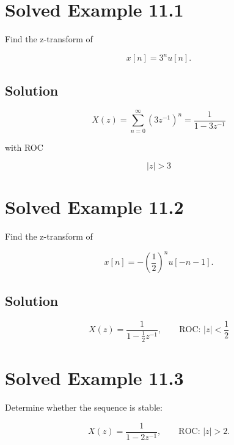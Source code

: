 
\section{Solved Example 11.1}

Find the z-transform of

\[
x[n]=3^n u[n].
\]


\subsection{Solution}

\[
X(z)=
\sum_{n=0}^{\infty}(3z^{-1})^n
=
\frac{1}{1-3z^{-1}}
\]

with ROC

\[
\boxed{
|z|>3
}
\]


\section{Solved Example 11.2}

Find the z-transform of

\[
x[n]=-\left(\frac12\right)^n u[-n-1].
\]


\subsection{Solution}

\[
\boxed{
X(z)=
\frac{1}{1-\frac12 z^{-1}},
\qquad
\text{ROC: }|z|<\frac12
}
\]


\section{Solved Example 11.3}

Determine whether the sequence is stable:

\[
X(z)=
\frac{1}{1-2z^{-1}},
\qquad
\text{ROC: }|z|>2.
\]


